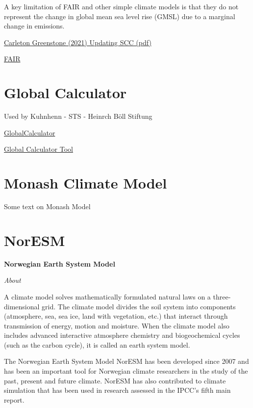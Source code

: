 \documentclass[
]{book}
\begin{document}
A key limitation of FAIR and other simple climate models is that they do not represent
the change in global mean sea level rise (GMSL) due to a marginal change in emissions.

\href{Greenstone_2021_Updating_SCC.pdf}{Carleton Greenstone (2021) Updating SCC (pdf)}

\href{https://fair.readthedocs.io/en/latest/}{FAIR}

\hypertarget{global-calculator}{%
\section{Global Calculator}\label{global-calculator}}

Used by Kuhnhenn - STS - Heinrch Böll Stiftung

\href{http://www.globalcalculator.org/}{GlobalCalculator}

\href{http://tool.globalcalculator.org/globcalc.html?levers=22rfoe2e\%2013be1111c2c2c1n31hfjdcef222hp233f211111fn2211111111/dashboard/en}{Global Calculator Tool}

\hypertarget{monash-climate-model}{%
\section{Monash Climate Model}\label{monash-climate-model}}

Some text on Monash Model

\hypertarget{noresm}{%
\section{NorESM}\label{noresm}}

\textbf{Norwegian Earth System Model}

\emph{About}

A climate model solves mathematically formulated natural laws on a three-dimensional grid. The climate model divides the soil system into components (atmosphere, sea, sea ice, land with vegetation, etc.) that interact through transmission of energy, motion and moisture. When the climate model also includes advanced interactive atmosphere chemistry and biogeochemical cycles (such as the carbon cycle), it is called an earth system model.

The Norwegian Earth System Model NorESM has been developed since 2007 and has been an important tool for Norwegian climate researchers in the study of the past, present and future climate. NorESM has also contributed to climate simulation that has been used in research assessed in the IPCC's fifth main report.
\end{document}
